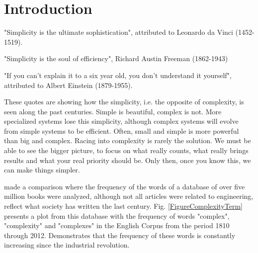 \section{Introduction}
"Simplicity is the ultimate sophistication", attributed to Leonardo da Vinci (1452-1519).


"Simplicity is the soul of efficiency", Richard Austin Freeman (1862-1943)


"If you can't explain it to a six year old, you don't understand it yourself", attributed to Albert Einstein (1879-1955).


These quotes are showing how the simplicity, i.e. the opposite of complexity, is seen along the past centuries. Simple is beautiful, complex is not. 
More specialized systems lose this simplicity, although complex systems will evolve from simple systems to be efficient.
Often, small and simple is more powerful than big and complex. Racing into complexity is rarely the solution. We must be able to see the bigger picture, to focus on what really counts, what really brings results and what your real priority should be. Only then, once you know this, we can make things simpler.


\cite{Davies10} made a comparison where the frequency of the words of a database of over five million books were analyzed, although not all articles were related to engineering, reflect what society has written the last century. Fig. \ref{FigureComplexityTerm} presents a plot from this database with the frequency of words "complex", "complexity" and "complexes" in the English Corpus from the period 1810 through 2012. Demonstrates that the frequency of these words is constantly increasing since the industrial revolution.
